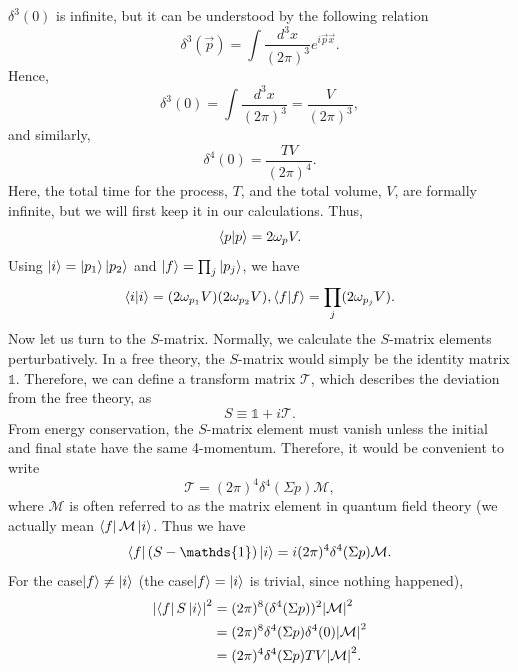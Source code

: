 \documentclass[11pt]{article}
\theoremstyle{definition}
\begin{document}
$\delta^3(0)$ is infinite, but it can be understood by the following relation
\begin{equation}
    \delta^3(\vec{p})=\int \frac{d^3x}{(2\pi)^3} e^{i\vec{p}\vec{x}}.
\end{equation}
Hence,
\begin{equation}
    \delta^3(0)=\int \frac{d^3x}{(2\pi)^3} = \frac{V}{(2\pi)^3},
\end{equation}
and similarly,
\begin{equation}
    \delta^4(0) = \frac{TV}{(2\pi)^4}.
\end{equation}
Here, the total time for the process, $T$, and the total volume, $V$, are formally infinite, but we will first keep it in our calculations. Thus,
\begin{equation}
    \braket{p}{p}=2\omega_p V.
\end{equation}
Using $\ket{i} = \ket{p_1}\ket{p_2}$ and $\ket{f} = \prod_j\ket{p_j}$, we have
\begin{equation}
    \braket{i}{i} = (2\omega_{p_1}V)(2\omega_{p_2}V),\braket{f}{f} = \prod_j(2\omega_{p_j}V).
\end{equation}
Now let us turn to the $S$-matrix. Normally, we calculate the $S$-matrix elements perturbatively. In a free theory, the $S$-matrix would simply be the identity matrix $\mathds{1}$. Therefore, we can define a transform matrix $\mathcal{T}$, which describes the deviation from the free theory, as
\begin{equation}
    S \equiv \mathds{1} + i\mathcal{T}.
\end{equation}
From energy conservation, the $S$-matrix element must vanish unless the initial and final state have the same 4-momentum. Therefore, it would be convenient to write
\begin{equation}
    \mathcal{T} = (2\pi)^4\delta^4(\Sigma p)\mathcal{M},
\end{equation}
where $\mathcal{M}$ is often referred to as the matrix element in quantum field theory (we actually mean $\bra{f}\mathcal{M}\ket{i}$. Thus we have
\begin{equation}
    \bra{f}(S-\mathds{1})\ket{i} = i(2\pi)^4\delta^4(\Sigma p)\mathcal{M}.
\end{equation}
For the case$\ket{f}\neq\ket{i}$ (the case$\ket{f}=\ket{i}$ is trivial, since nothing happened),
\begin{equation}
\begin{aligned}
        \abs{\bra{f}S\ket{i}}^2 &=  (2\pi)^8(\delta^4(\Sigma p))^2\abs{\mathcal{M}}^2 \\
        & =(2\pi)^8\delta^4(\Sigma p)\delta^4(0)\abs{\mathcal{M}}^2 \\
        & =(2\pi)^4\delta^4(\Sigma p)TV\abs{\mathcal{M}}^2.
\end{aligned}
\end{equation}
\end{document}
